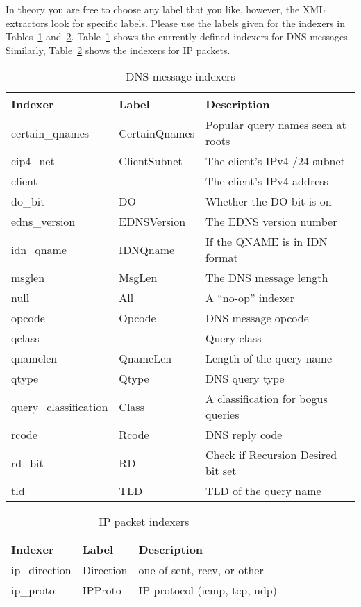 \documentclass{report}
\begin{document}
In theory you are free to choose any label that you like, however,
the XML extractors look for specific labels.  Please use the labels
given for the indexers in Tables~\ref{tbl-dns-indexers}
and~\ref{tbl-ip-indexers}.  Table~\ref{tbl-dns-indexers} shows the
currently-defined indexers for DNS messages.  Similarly,
Table~\ref{tbl-ip-indexers} shows the indexers for IP packets.

\begin{table}
\begin{center}
\begin{tabular}{|lll|}
\hline
Indexer & Label & Description \\
\hline 
certain\_qnames & CertainQnames & Popular query names seen at roots \\
cip4\_net & ClientSubnet & The client's IPv4 /24 subnet \\
client & - & The client's IPv4 address \\
do\_bit & DO & Whether the DO bit is on \\
edns\_version & EDNSVersion & The EDNS version number \\
idn\_qname & IDNQname & If the QNAME is in IDN format \\
msglen & MsgLen & The DNS message length \\
null & All & A ``no-op'' indexer \\
opcode & Opcode & DNS message opcode \\
qclass & - & Query class \\
qnamelen & QnameLen & Length of the query name \\
qtype & Qtype & DNS query type \\
query\_classification & Class & A classification for bogus queries \\
rcode & Rcode & DNS reply code \\
rd\_bit & RD & Check if Recursion Desired bit set \\
tld & TLD & TLD of the query name \\
\hline
\end{tabular}
\caption{\label{tbl-dns-indexers}DNS message indexers}
\end{center}
\end{table}

\begin{table}
\begin{center}
\begin{tabular}{|lll|}
\hline
Indexer & Label & Description \\
\hline 
ip\_direction & Direction & one of sent, recv, or other \\
ip\_proto & IPProto & IP protocol (icmp, tcp, udp) \\
\hline
\end{tabular}
\caption{\label{tbl-ip-indexers}IP packet indexers}
\end{center}
\end{table}
\end{document}
